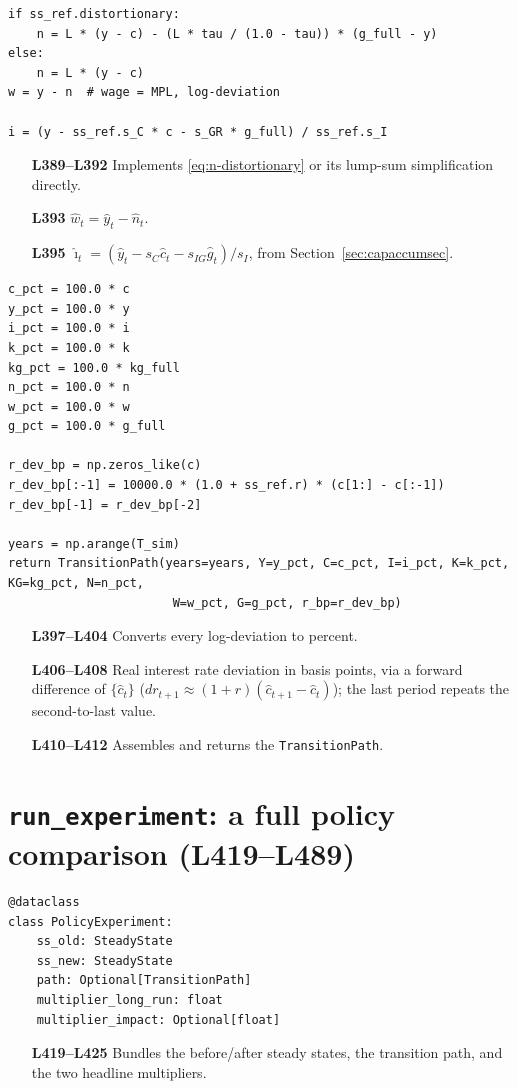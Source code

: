 \documentclass[11pt]{article}
\begin{document}
\begin{lstlisting}[firstnumber=389]
if ss_ref.distortionary:
    n = L * (y - c) - (L * tau / (1.0 - tau)) * (g_full - y)
else:
    n = L * (y - c)
w = y - n  # wage = MPL, log-deviation

i = (y - ss_ref.s_C * c - s_GR * g_full) / ss_ref.s_I
\end{lstlisting}
\begin{itemize}
\item[\textbf{L389--L392}] Implements \eqref{eq:n-distortionary} or its
lump-sum simplification directly.
\item[\textbf{L393}] $\hat w_t=\hat y_t-\hat n_t$.
\item[\textbf{L395}] $\hat\imath_t=(\hat y_t-s_C\hat c_t-s_{IG}\hat
g_t)/s_I$, from Section~\ref{sec:capaccumsec}.
\end{itemize}

\begin{lstlisting}[firstnumber=397]
c_pct = 100.0 * c
y_pct = 100.0 * y
i_pct = 100.0 * i
k_pct = 100.0 * k
kg_pct = 100.0 * kg_full
n_pct = 100.0 * n
w_pct = 100.0 * w
g_pct = 100.0 * g_full

r_dev_bp = np.zeros_like(c)
r_dev_bp[:-1] = 10000.0 * (1.0 + ss_ref.r) * (c[1:] - c[:-1])
r_dev_bp[-1] = r_dev_bp[-2]

years = np.arange(T_sim)
return TransitionPath(years=years, Y=y_pct, C=c_pct, I=i_pct, K=k_pct, KG=kg_pct, N=n_pct,
                       W=w_pct, G=g_pct, r_bp=r_dev_bp)
\end{lstlisting}
\begin{itemize}
\item[\textbf{L397--L404}] Converts every log-deviation to percent.
\item[\textbf{L406--L408}] Real interest rate deviation in basis points,
via a forward difference of $\{\hat c_t\}$ ($dr_{t+1}\approx(1+r)(\hat
c_{t+1}-\hat c_t)$); the last period repeats the second-to-last value.
\item[\textbf{L410--L412}] Assembles and returns the \texttt{TransitionPath}.
\end{itemize}

\section{\texttt{run\_experiment}: a full policy comparison (L419--L489)}
\label{sec:expsec}

\begin{lstlisting}[firstnumber=419]
@dataclass
class PolicyExperiment:
    ss_old: SteadyState
    ss_new: SteadyState
    path: Optional[TransitionPath]
    multiplier_long_run: float
    multiplier_impact: Optional[float]
\end{lstlisting}
\begin{itemize}
\item[\textbf{L419--L425}] Bundles the before/after steady states, the
transition path, and the two headline multipliers.
\end{itemize}
\end{document}
